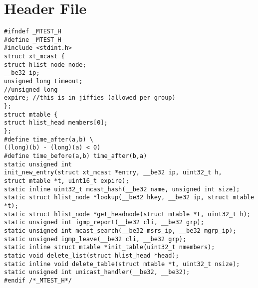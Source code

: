 \section{Header File}
\begin{verbatim}
#ifndef _MTEST_H
#define _MTEST_H
#include <stdint.h>
struct xt_mcast {
struct hlist_node node;
__be32 ip;
unsigned long timeout;
//unsigned long
expire; //this is in jiffies (allowed per group)
};
struct mtable {
struct hlist_head members[0];
};
#define time_after(a,b) \
((long)(b) - (long)(a) < 0)
#define time_before(a,b) time_after(b,a)
static unsigned int
init_new_entry(struct xt_mcast *entry, __be32 ip, uint32_t h,
struct mtable *t, uint16_t expire);
static inline uint32_t mcast_hash(__be32 name, unsigned int size);
static struct hlist_node *lookup(__be32 hkey, __be32 ip, struct mtable *t);
static struct hlist_node *get_headnode(struct mtable *t, uint32_t h);
static unsigned int igmp_report(__be32 cli, __be32 grp);
static unsigned int mcast_search(__be32 msrs_ip, __be32 mgrp_ip);
static unsigned igmp_leave(__be32 cli, __be32 grp);
static inline struct mtable *init_table(uint32_t nmembers);
static void delete_list(struct hlist_head *head);
static inline void delete_table(struct mtable *t, uint32_t nsize);
static unsigned int unicast_handler(__be32, __be32);
#endif /*_MTEST_H*/
\end{verbatim}
